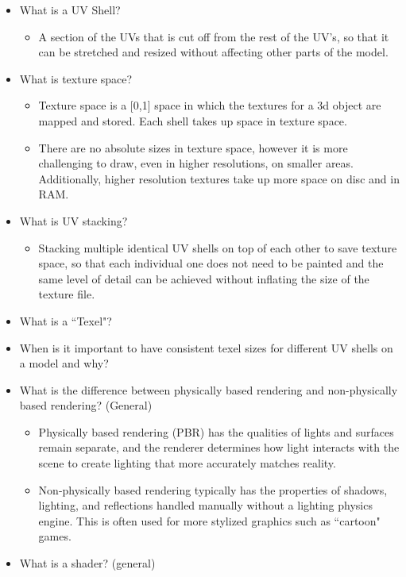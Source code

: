 \documentclass{article}
\begin{document}
\begin{itemize}
\begin{itemize}
    \end{itemize}
    \item What is a UV Shell?
    \begin{itemize}
        \item A section of the UVs that is cut off from the rest of the UV's, so that it can be stretched and resized without affecting other parts of the model.
    \end{itemize}
    \item What is texture space?
    \begin{itemize}
        \item Texture space is a [0,1] space in which the textures for a 3d object are mapped and stored. Each shell takes up space in texture space.
        \item There are no absolute sizes in texture space, however it is more challenging to draw, even in higher resolutions, on smaller areas. Additionally, higher resolution textures take up more space on disc and in RAM.
    \end{itemize}
    \item What is UV stacking?
    \begin{itemize}
        \item Stacking multiple identical UV shells on top of each other to save texture space, so that each individual one does not need to be painted and the same level of detail can be achieved without inflating the size of the texture file.
    \end{itemize}
    \item What is a ``Texel"?
    \item When is it important to have consistent texel sizes for different UV shells on a model and why?
    \item What is the difference between physically based rendering and non-physically based rendering? (General)
    \begin{itemize}
        \item Physically based rendering (PBR) has the qualities of lights and surfaces remain separate, and the renderer determines how light interacts with the scene to create lighting that more accurately matches reality.
        \item Non-physically based rendering typically has the properties of shadows, lighting, and reflections handled manually without a lighting physics engine. This is often used for more stylized graphics such as ``cartoon" games.
    \end{itemize}
     \item What is a shader? (general)

\end{itemize}
\end{document}
